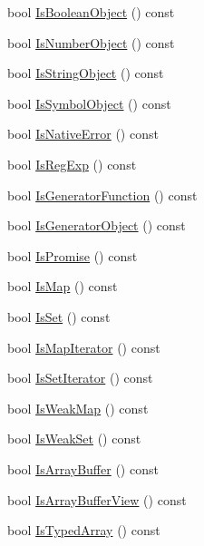 \begin{DoxyCompactItemize}
\item 
bool \hyperlink{classv8_1_1_value_abe7bc06283e5e66013f2f056a943168b}{Is\+Boolean\+Object} () const 
\item 
bool \hyperlink{classv8_1_1_value_a5f4aa9504a6d8fc3af9489330179fe14}{Is\+Number\+Object} () const 
\item 
bool \hyperlink{classv8_1_1_value_a3e0f2727455fd01a39a60b92f77e28e0}{Is\+String\+Object} () const 
\item 
bool \hyperlink{classv8_1_1_value_a867baa94cb8f1069452359e6cef6751e}{Is\+Symbol\+Object} () const 
\item 
bool \hyperlink{classv8_1_1_value_a579fb52e893cdc24f8b77e5acc77d06d}{Is\+Native\+Error} () const 
\item 
bool \hyperlink{classv8_1_1_value_aae41e43486937d6122c297a0d43ac0b8}{Is\+Reg\+Exp} () const 
\item 
bool \hyperlink{classv8_1_1_value_a1cbbebde8c256d051c4606a7300870c6}{Is\+Generator\+Function} () const 
\item 
bool \hyperlink{classv8_1_1_value_a72982768acdadd82d1df02a452251d14}{Is\+Generator\+Object} () const 
\item 
bool \hyperlink{classv8_1_1_value_a93d6a0817b15a1d28050ba16e131e6b4}{Is\+Promise} () const 
\item 
bool \hyperlink{classv8_1_1_value_a71ef50f22d6bb4a093cc931b3d981c08}{Is\+Map} () const 
\item 
bool \hyperlink{classv8_1_1_value_a220bd4056471ee1dda8ab9565517edd7}{Is\+Set} () const 
\item 
bool \hyperlink{classv8_1_1_value_af9c52a0668fa3260a0d12a2cdf895b4e}{Is\+Map\+Iterator} () const 
\item 
bool \hyperlink{classv8_1_1_value_addbae0104e07b990ee1af0bd7927824b}{Is\+Set\+Iterator} () const 
\item 
bool \hyperlink{classv8_1_1_value_aab0297b39ed8e2a71b5dca7950228a36}{Is\+Weak\+Map} () const 
\item 
bool \hyperlink{classv8_1_1_value_a6f5a238206cbd95f98e2da92cab72e80}{Is\+Weak\+Set} () const 
\item 
bool \hyperlink{classv8_1_1_value_a65f9dad740f2468b44dc16349611c351}{Is\+Array\+Buffer} () const 
\item 
bool \hyperlink{classv8_1_1_value_ad54475d15b7e6b6e17fc80fb4570cdf2}{Is\+Array\+Buffer\+View} () const 
\item 
bool \hyperlink{classv8_1_1_value_ac2f2f6c39f14a39fbb5b43577125dfe4}{Is\+Typed\+Array} () const 
\item 

\end{DoxyCompactItemize}
